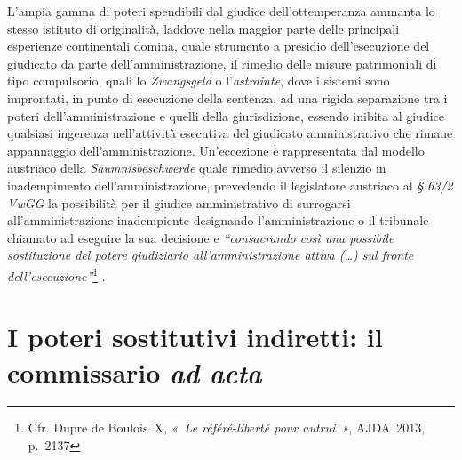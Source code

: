 \documentclass[12pt,it,a4paper,]{report}
\begin{document}
L'ampia gamma di poteri spendibili dal giudice dell'ottemperanza ammanta
lo stesso istituto di originalità, laddove nella maggior parte delle
principali esperienze continentali domina, quale strumento a presidio
dell'esecuzione del giudicato da parte dell'amministrazione, il rimedio
delle misure patrimoniali di tipo compulsorio, quali lo
\emph{Zwangsgeld} o l'\emph{astrainte}, dove i sistemi sono improntati,
in punto di esecuzione della sentenza, ad una rigida separazione tra i
poteri dell'amministrazione e quelli della giurisdizione, essendo
inibita al giudice qualsiasi ingerenza nell'attività esecutiva del
giudicato amministrativo che rimane appannaggio dell'amministrazione.
Un'eccezione è rappresentata dal modello austriaco della
\emph{Säumnisbeschwerde} quale rimedio avverso il silenzio in
inadempimento dell'amministrazione, prevedendo il legislatore austriaco
al \emph{§ 63/2 VwGG} la possibilità per il giudice amministrativo di
surrogarsi all'amministrazione inadempiente designando l'amministrazione
o il tribunale chiamato ad eseguire la sua decisione e
\emph{``consacrando così una possibile sostituzione del potere
giudiziario all'amministrazione attiva (\ldots) sul fronte
dell'esecuzione''}\footnote{Cfr. Dupre de Boulois~X, \emph{«~Le
  référé-liberté pour autrui~»}, AJDA~2013, p.~2137} .

\hypertarget{i-poteri-sostitutivi-indiretti-il-commissario-ad-acta}{%
\section{\texorpdfstring{I poteri sostitutivi indiretti: il commissario
\emph{ad
acta}}{I poteri sostitutivi indiretti: il commissario ad acta}}\label{i-poteri-sostitutivi-indiretti-il-commissario-ad-acta}}
\end{document}
